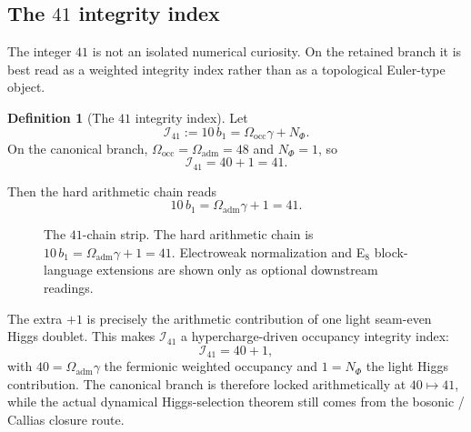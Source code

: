 \documentclass[11pt,a4paper]{article}
\theoremstyle{definition}
\newtheorem{definition}[theorem]{Definition}
\theoremstyle{remark}
\newcommand{\bone}{b_1}
\newcommand{\Oadm}{\Omega_{\mathrm{adm}}}
\begin{document}
\subsection{The \texorpdfstring{$41$}{41} integrity index}

The integer $41$ is not an isolated numerical curiosity. On the retained branch it is best read as a weighted integrity index rather than as a topological Euler-type object.
\begin{definition}[The \texorpdfstring{$41$}{41} integrity index]
\label{def:integrity-index-41}
Let
\[
\mathcal I_{41}:=10\,\bone=\Omega_{\mathrm{occ}}\gamma+N_\Phi.
\]
On the canonical branch, $\Omega_{\mathrm{occ}}=\Oadm=48$ and $N_\Phi=1$, so
\[
\mathcal I_{41}=40+1=41.
\]
\end{definition}

Then the hard arithmetic chain reads
\begin{equation}
\label{eq:41-chain-main}
10\,\bone
=
\Oadm\gamma+1
=
41.
\end{equation}
\begin{figure}[t]
\centering
\footnotesize
{}
\caption{The $41$-chain strip. The hard arithmetic chain is $10\,\bone=\Oadm\gamma+1=41$. Electroweak normalization and E$_8$ block-language extensions are shown only as optional downstream readings.}
\label{fig:41-chain-strip}
\end{figure}
The extra $+1$ is precisely the arithmetic contribution of one light seam-even Higgs doublet. This makes $\mathcal I_{41}$ a hypercharge-driven occupancy integrity index:
\[
\mathcal I_{41}=40+1,
\]
with $40=\Oadm\gamma$ the fermionic weighted occupancy and $1=N_\Phi$ the light Higgs contribution. The canonical branch is therefore locked arithmetically at $40\mapsto 41$, while the actual dynamical Higgs-selection theorem still comes from the bosonic / Callias closure route.
\end{document}

